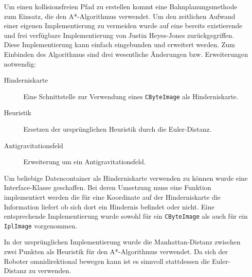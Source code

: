 Um einen kollisionsfreien Pfad zu erstellen kommt eine Bahnplanungsmethode zum Einsatz, die den A*-Algorithmus verwendet. Um den zeitlichen Aufwand einer eigenen Implementierung zu vermeiden wurde auf eine bereits existierende und frei verfügbare Implementierung von Justin Heyes-Jones zurückgegriffen.
Diese Implementierung kann einfach eingebunden und erweitert werden. Zum Einbinden des Algorithmus sind drei wesentliche Änderungen bzw. Erweiterungen notwendig:
\begin{description}
	\item[Hinderniskarte] Eine Schnittstelle zur Verwendung eines \lstinline{CByteImage} als Hinderniskarte.
	\item[Heuristik] Ersetzen der ursprünglichen Heuristik durch die Euler-Distanz.
	\item[Antigravitationsfeld] Erweiterung um ein Antigravitationsfeld.
\end{description}

Um beliebige Datencontainer als Hinderniskarte verwenden zu können wurde eine Interface-Klasse geschaffen. Bei deren Umsetzung muss eine Funktion implementiert werden die für eine Koordinate auf der Hinderniskarte die Information liefert ob sich dort ein Hindernis befindet oder nicht. Eine entsprechende Implementierung wurde sowohl für ein \lstinline{CByteImage} als auch für ein \lstinline{IplImage} vorgenommen.

In der ursprünglichen Implementierung wurde die Manhattan-Distanz zwischen zwei Punkten als Heuristik für den A*-Algorithmus verwendet. Da sich der Roboter omnidirektional bewegen kann ist es sinnvoll stattdessen die Euler-Distanz zu verwenden.

